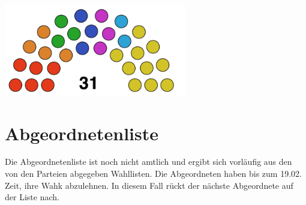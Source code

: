 \documentclass{sasbase}
\begin{document}
\begin{center}
		\includegraphics[width=8cm]{parliament.png}
	\end{center}
\newpage

\section{Abgeordnetenliste}

Die Abgeordnetenliste ist noch nicht amtlich und ergibt sich vorläufig aus den von den Parteien abgegeben Wahllisten. Die Abgeordneten haben bis zum 19.02. Zeit, ihre Wahk
abzulehnen. In diesem Fall rückt der nächste Abgeordnete auf der Liste nach. 
\end{document}
